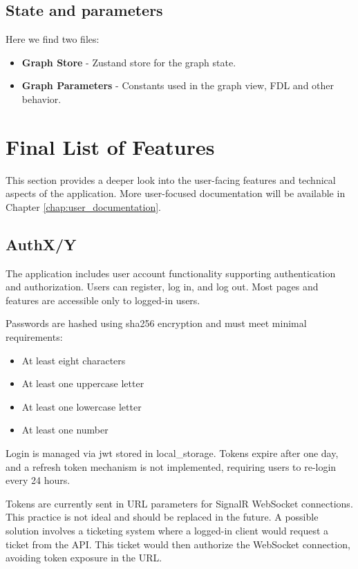 \subsection*{State and parameters}
Here we find two files:
\begin{itemize}
    \item \textbf{Graph Store} - Zustand store for the graph state.
    \item \textbf{Graph Parameters} - Constants used in the graph view, \gls{FDL} and other behavior.
\end{itemize}

\section{Final List of Features}
This section provides a deeper look into the user-facing features and technical aspects of the application.
More user-focused documentation will be available in Chapter \ref{chap:user_documentation}.

\subsection{AuthX/Y}
The application includes user account functionality supporting authentication and authorization.
Users can register, log in, and log out. Most pages and features are accessible only to logged-in users.

Passwords are hashed using \gls{sha256} encryption and must meet minimal requirements:
\begin{itemize}
\item At least eight characters
\item At least one uppercase letter
\item At least one lowercase letter
\item At least one number
\end{itemize}

Login is managed via \gls{jwt} stored in \gls{local_storage}.
Tokens expire after one day, and a refresh token mechanism is not implemented, requiring users to re-login every 24 hours.

Tokens are currently sent in URL parameters for SignalR WebSocket connections.
This practice is not ideal and should be replaced in the future.
A possible solution involves a ticketing system where a logged-in client would request a ticket from the API.
This ticket would then authorize the WebSocket connection, avoiding token exposure in the URL. %

